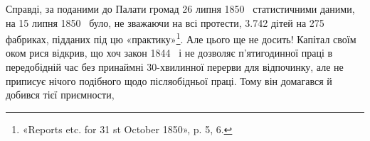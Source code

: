 Справді, за поданими до Палати громад 26 липня 1850~
статистичними даними, на 15 липня 1850~ було, не зважаючи
на всі протести, \num{3.742} дітей на 275 фабриках, підданих під цю
«практику»\footnote{
«Reports etc. for 31 st October 1850», p. 5, 6.
}. Але цього ще не досить! Капітал своїм оком
рися відкрив, що хоч закон 1844~ і не дозволяє п’ятигодинної
праці в передобідній час без принаймні 30-хвилинної перерви
для відпочинку, але не приписує нічого подібного щодо післяобідньої
праці. Тому він домагався й добився тієї приємности,
\parbreak{}  %
